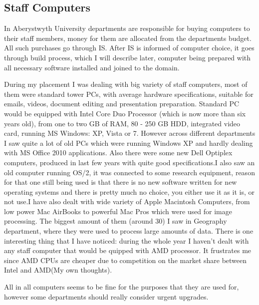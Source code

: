 \documentclass[10pt,a4paper,headinclude=true]{report}
\begin{document}
\subsection{Staff Computers}
In Aberystwyth University departments are responsible for buying computers to their staff members, money for them are allocated from the departments budget. All such purchases go through IS. After IS is informed of computer choice, it goes through build process, which I will describe later, computer being prepared with all necessary software installed and joined to the domain. 

During my placement I was dealing with big variety of staff computers, most of them were standard tower PCs, with average hardware specifications, suitable for emails, videos, document editing and presentation preparation. Standard PC would be equipped with Intel Core Duo Processor (which is now more than six years old), from one to two GB of RAM, 80 - 250 GB HDD, integrated video card, running MS Windows: XP, Vista or 7. However across different departments I saw quite a lot of old PCs which were running Windows XP and hardly dealing with MS Office 2010 applications. Also there were some new Dell Optiplex computers, produced in last few years with quite good specifications.I also saw an old computer running OS/2, it was connected to some research equipment, reason for that one still being used is that there is no new software written for new operating systems and there is pretty much no choice, you either use it as it is, or not use.I have also dealt with wide variety of Apple Macintosh Computers, from low power Mac AirBooks to powerful Mac Pros which were used for image processing. The biggest amount of them (around 30) I saw in Geography department, where they were used to process large amounts of data. There is one interesting thing that I have noticed: during the whole year I haven't dealt with any staff computer that would be quipped with AMD processor. It frustrates me since AMD CPUs are cheaper due to competition on the market share between Intel and AMD(My own thoughts).

All in all computers seems to be fine for the purposes that they are used for, however some departments should really consider urgent upgrades. 
\end{document}
